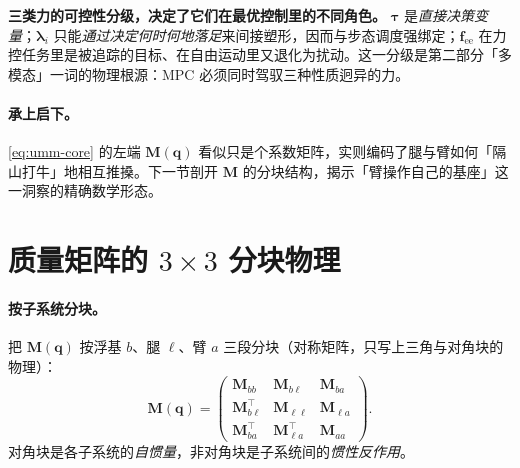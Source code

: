 \begin{insight}
\textbf{三类力的可控性分级，决定了它们在最优控制里的不同角色。}\;
$\boldsymbol\tau$ 是\emph{直接决策变量}；$\boldsymbol\lambda_i$ 只能\emph{通过决定何时何地落足}来间接塑形，因而与步态调度强绑定；$\mathbf f_{\text{ee}}$ 在力控任务里是被追踪的目标、在自由运动里又退化为扰动。这一分级是第二部分「多模态」一词的物理根源：MPC 必须同时驾驭三种性质迥异的力。
\end{insight}

\paragraph{承上启下。}
\cref{eq:umm-core} 的左端 $\mathbf M(\mathbf q)$ 看似只是个系数矩阵，实则编码了腿与臂如何「隔山打牛」地相互推搡。下一节剖开 $\mathbf M$ 的分块结构，揭示「臂操作自己的基座」这一洞察的精确数学形态。

\section{质量矩阵的 \texorpdfstring{$3\times3$}{3x3} 分块物理}
\label{sec:umm-mblocks}

\paragraph{按子系统分块。}
把 $\mathbf M(\mathbf q)$ 按浮基 $b$、腿 $\ell$、臂 $a$ 三段分块（对称矩阵，只写上三角与对角块的物理）：
\begin{equation}
  \mathbf M(\mathbf q)=\begin{pmatrix}
  \mathbf M_{bb} & \mathbf M_{b\ell} & \mathbf M_{ba}\\
  \mathbf M_{b\ell}^\top & \mathbf M_{\ell\ell} & \mathbf M_{\ell a}\\
  \mathbf M_{ba}^\top & \mathbf M_{\ell a}^\top & \mathbf M_{aa}
  \end{pmatrix}.
  \label{eq:umm-Mblocks}
\end{equation}
对角块是各子系统的\emph{自惯量}，非对角块是子系统间的\emph{惯性反作用}。

